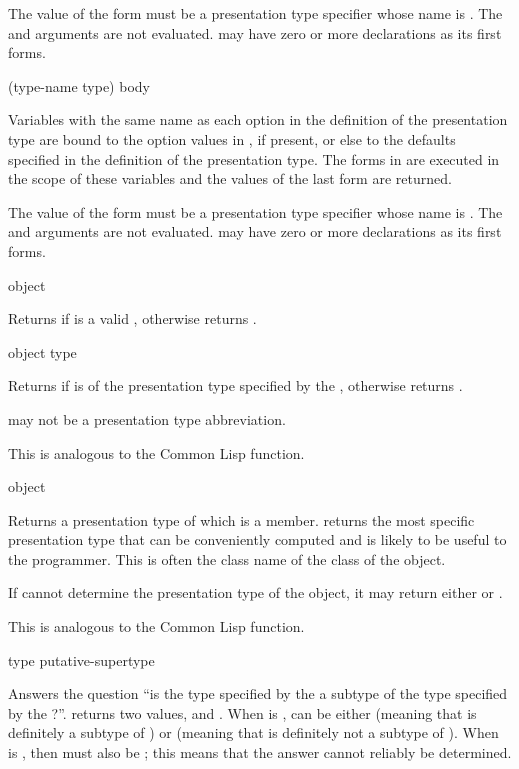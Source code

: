 The value of the form  must be a presentation type specifier whose
name is .  The  and  arguments are not
evaluated.   may have zero or more declarations as its first forms.

 {(type-name type) \body body}

Variables with the same name as each option in the definition of the
presentation type are bound to the option values in , if present, or
else to the defaults specified in the definition of the presentation type.  The
forms in  are executed in the scope of these variables and the values
of the last form are returned.

The value of the form  must be a presentation type specifier whose
name is .  The  and  arguments are not
evaluated.   may have zero or more declarations as its first forms.


 {object}

Returns  if  is a valid , otherwise returns .


 {object type}

Returns  if  is of the presentation type specified by the
 , otherwise returns .

 may not be a presentation type abbreviation.

This is analogous to the Common Lisp  function.


 {object}

Returns a presentation type of which  is a member.
 returns the most specific presentation type that can
be conveniently computed and is likely to be useful to the programmer.  This is
often the class name of the class of the object.

If  cannot determine the presentation type of the
object, it may return either  or .

This is analogous to the Common Lisp  function.


 {type putative-supertype}

Answers the question ``is the type specified by the   a subtype of the type specified by the  ?''.   returns
two values,  and .  When  is
,  can be either  (meaning that 
is definitely a subtype of ) or  (meaning
that  is definitely not a subtype of ).  When
 is , then  must also be ;
this means that the answer cannot reliably be determined.

